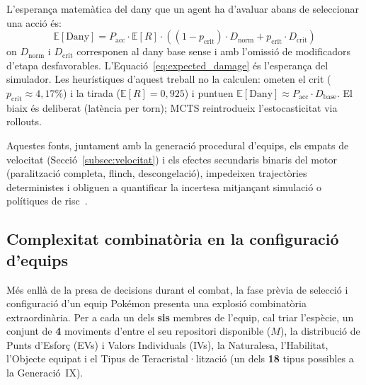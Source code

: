 L'esperança matemàtica del dany que un agent ha d'avaluar abans de seleccionar una acció és:
\begin{equation}
    \mathbb{E}[\mathrm{Dany}] = P_{\mathrm{acc}} \cdot \mathbb{E}[R] \cdot \left( (1 - p_{\mathrm{crit}}) \cdot D_{\mathrm{norm}} + p_{\mathrm{crit}} \cdot D_{\mathrm{crit}} \right)
    \label{eq:expected_damage}
\end{equation}
on $D_{\mathrm{norm}}$ i $D_{\mathrm{crit}}$ corresponen al dany base sense i amb l'omissió de modificadors d'etapa desfavorables. L'Equació~\ref{eq:expected_damage} és l'esperança del simulador. Les heurístiques d'aquest treball no la calculen: ometen el crit ($p_{\mathrm{crit}} \approx 4{,}17\%$) i la tirada ($\mathbb{E}[R] = 0{,}925$) i puntuen $\mathbb{E}[\mathrm{Dany}] \approx P_{\mathrm{acc}} \cdot D_{\mathrm{base}}$. El biaix és deliberat (latència per torn); MCTS reintrodueix l'estocasticitat via rollouts.

Aquestes fonts, juntament amb la generació procedural d'equips, els empats de velocitat (Secció~\ref{subsec:velocitat}) i els efectes secundaris binaris del motor (paralització completa, flinch, descongelació), impedeixen trajectòries deterministes i obliguen a quantificar la incertesa mitjançant simulació o polítiques de risc~\cite{grigsby_metamon,pokemon_rl_huang}.

\subsection{Complexitat combinatòria en la configuració d'equips}
\label{subsec:complexitat_equips}

Més enllà de la presa de decisions durant el combat, la fase prèvia de selecció i configuració d'un equip Pokémon presenta una explosió combinatòria extraordinària. Per a cada un dels \textbf{sis} membres de l'equip, cal triar l'espècie, un conjunt de \textbf{4} moviments d'entre el seu repositori disponible ($M$), la distribució de Punts d'Esforç (EVs) i Valors Individuals (IVs), la Naturalesa, l'Habilitat, l'Objecte equipat i el Tipus de Teracristal·lització (un dels \textbf{18} tipus possibles a la Generació~IX).

